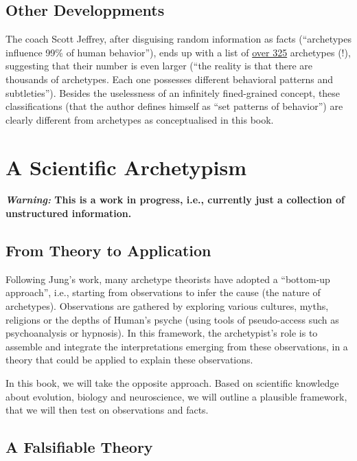 \documentclass[]{book}
\begin{document}
\hypertarget{other-developpments}{%
\section{Other Developpments}\label{other-developpments}}

The coach Scott Jeffrey, after disguising random information as facts (``archetypes influence 99\% of human behavior''), ends up with a list of \href{https://scottjeffrey.com/archetypes-list/}{over 325} archetypes (!), suggesting that their number is even larger (``the reality is that there are thousands of archetypes. Each one possesses different behavioral patterns and subtleties''). Besides the uselessness of an infinitely fined-grained concept, these classifications (that the author defines himself as ``set patterns of behavior'') are clearly different from archetypes as conceptualised in this book.

\hypertarget{a-scientific-archetypism}{%
\chapter{A Scientific Archetypism}\label{a-scientific-archetypism}}

\textbf{\emph{Warning:} This is a work in progress, i.e., currently just a collection of unstructured information.}

\hypertarget{from-theory-to-application}{%
\section{From Theory to Application}\label{from-theory-to-application}}

Following Jung's work, many archetype theorists have adopted a ``bottom-up approach'', i.e., starting from observations to infer the cause (the nature of archetypes). Observations are gathered by exploring various cultures, myths, religions or the depths of Human's psyche (using tools of pseudo-access such as psychoanalysis or hypnosis). In this framework, the archetypist's role is to assemble and integrate the interpretations emerging from these observations, in a theory that could be applied to explain these observations.

In this book, we will take the opposite approach. Based on scientific knowledge about evolution, biology and neuroscience, we will outline a plausible framework, that we will then test on observations and facts.

\hypertarget{a-falsifiable-theory}{%
\section{A Falsifiable Theory}\label{a-falsifiable-theory}}
\end{document}
